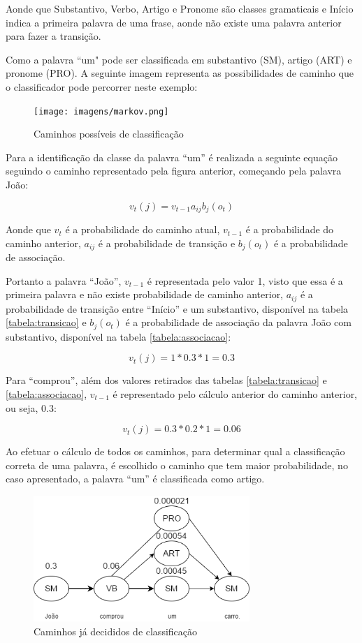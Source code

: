 Aonde que Substantivo, Verbo, Artigo e Pronome são classes gramaticais e Início
indica a primeira palavra de uma frase, aonde não existe uma palavra anterior
para fazer a transição.

Como a palavra ``um" pode ser classificada
em substantivo (SM), artigo (ART) e pronome (PRO). A seguinte imagem representa
as possibilidades de caminho que o classificador pode percorrer neste exemplo:

\begin{figure}[htbp]
 \centering
 \texttt{[image: imagens/markov.png]}
 \caption{Caminhos possíveis de classificação}
 \label{fig:markov}
\end{figure}

\newpage
Para a identificação da classe da palavra ``um'' é realizada a seguinte equação
seguindo o caminho representado pela figura anterior, começando pela palavra
João:

\[ v_t(j) = v_{t-1} a_{ij} b_j(o_t) \]

Aonde que $v_t$ é a probabilidade do caminho atual, $v_{t-1}$ é a
probabilidade do caminho anterior, $a_{ij}$ é a probabilidade de transição e $b_j(o_t)$ é a
probabilidade de associação.

Portanto a palavra ``João'', $v_{t-1}$ é representada pelo valor 1, visto
que essa é a primeira palavra e não existe probabilidade de caminho
anterior, $a_{ij}$ é a probabilidade de transição entre ``Início'' e um
substantivo, disponível na tabela \ref{tabela:transicao} e $b_j(o_t)$ é
a probabilidade de associação da palavra João com substantivo, disponível na
tabela \ref{tabela:associacao}:

\[ v_t(j) = 1 * 0.3 * 1 = 0.3 \]

Para ``comprou'', além dos valores retirados das tabelas \ref{tabela:transicao}
e \ref{tabela:associacao}, $v_{t-1}$ é representado pelo cálculo anterior do
caminho anterior, ou seja, 0.3:

\[ v_t(j) = 0.3 * 0.2 * 1 = 0.06 \] 

Ao efetuar o cálculo de todos os caminhos, para determinar qual a classificação
correta de uma palavra, é escolhido o caminho que tem maior probabilidade, no
caso apresentado, a palavra ``um'' é classificada como artigo.

\begin{figure}[htbp]
 \centering
 \includegraphics[height=180px]{imagens/markov2.png}
 \caption{Caminhos já decididos de classificação}
 \label{fig:markov2}
\end{figure}

